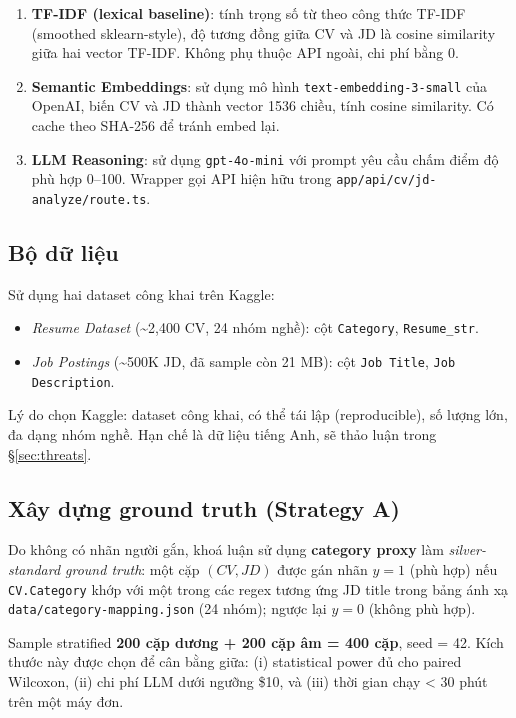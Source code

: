 \documentclass[../DoAn.tex]{subfiles}
\begin{document}
\begin{enumerate}
    \item \textbf{TF-IDF (lexical baseline)}: tính trọng số từ theo công thức TF-IDF (smoothed sklearn-style), độ tương đồng giữa CV và JD là cosine similarity giữa hai vector TF-IDF. Không phụ thuộc API ngoài, chi phí bằng 0.
    \item \textbf{Semantic Embeddings}: sử dụng mô hình \texttt{text-embedding-3-small} của OpenAI, biến CV và JD thành vector 1536 chiều, tính cosine similarity. Có cache theo SHA-256 để tránh embed lại.
    \item \textbf{LLM Reasoning}: sử dụng \texttt{gpt-4o-mini} với prompt yêu cầu chấm điểm độ phù hợp 0--100. Wrapper gọi API hiện hữu trong \texttt{app/api/cv/jd-analyze/route.ts}.
\end{enumerate}

\subsection{Bộ dữ liệu}

Sử dụng hai dataset công khai trên Kaggle:

\begin{itemize}
    \item \textit{Resume Dataset} (\textasciitilde 2,400 CV, 24 nhóm nghề): cột \texttt{Category}, \texttt{Resume\_str}.
    \item \textit{Job Postings} (\textasciitilde 500K JD, đã sample còn 21 MB): cột \texttt{Job Title}, \texttt{Job Description}.
\end{itemize}

Lý do chọn Kaggle: dataset công khai, có thể tái lập (reproducible), số lượng lớn, đa dạng nhóm nghề. Hạn chế là dữ liệu tiếng Anh, sẽ thảo luận trong \S\ref{sec:threats}.

\subsection{Xây dựng ground truth (Strategy A)}
\label{sec:gt}

Do không có nhãn người gắn, khoá luận sử dụng \textbf{category proxy} làm \textit{silver-standard ground truth}: một cặp $(CV, JD)$ được gán nhãn $y=1$ (phù hợp) nếu \texttt{CV.Category} khớp với một trong các regex tương ứng JD title trong bảng ánh xạ \texttt{data/category-mapping.json} (24 nhóm); ngược lại $y=0$ (không phù hợp).

Sample stratified \textbf{200 cặp dương + 200 cặp âm = 400 cặp}, seed = 42. Kích thước này được chọn để cân bằng giữa: (i) statistical power đủ cho paired Wilcoxon, (ii) chi phí LLM dưới ngưỡng \$10, và (iii) thời gian chạy < 30 phút trên một máy đơn.
\end{document}
